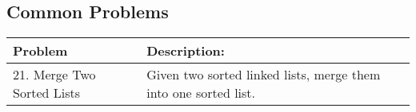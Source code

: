\subsection{Common Problems}
\begin{summary}
    \begin{center}
        \begin{tabular}{ll}
            \toprule
            \textbf{Problem} & \textbf{Description:} \\
            \midrule
                21. Merge Two Sorted Lists & Given two sorted linked lists, merge them into one sorted list. \\

\end{tabular}
\end{center}
\end{summary}
